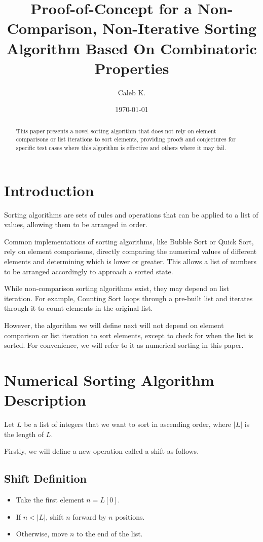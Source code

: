 \documentclass[12pt]{article}
\title{Proof-of-Concept for a Non-Comparison, Non-Iterative Sorting Algorithm Based On Combinatoric Properties}
\author{Caleb K.}
\date{\today}
\begin{document}
\maketitle

\begin{abstract}
This paper presents a novel sorting algorithm that does not rely on element comparisons or list iterations to sort elements, providing proofs and conjectures for specific test cases where this algorithm is effective and others where it may fail.
\end{abstract}

\section{Introduction}

Sorting algorithms are sets of rules and operations that can be applied to a list of values, allowing them to be arranged in order.

Common implementations of sorting algorithms, like Bubble Sort or Quick Sort, rely on element comparisons, directly comparing the numerical values of different elements and determining which is lower or greater. This allows a list of numbers to be arranged accordingly to approach a sorted state.

While non-comparison sorting algorithms exist, they may depend on list iteration. For example, Counting Sort loops through a pre-built list and iterates through it to count elements in the original list.

However, the algorithm we will define next will not depend on element comparison or list iteration to sort elements, except to check for when the list is sorted. For convenience, we will refer to it as numerical sorting in this paper.

\section{Numerical Sorting Algorithm Description}
Let $L$ be a list of integers that we want to sort in ascending order, where $|L|$ is the length of $L$.

Firstly, we will define a new operation called a shift as follows.

\subsection*{Shift Definition}

\begin{itemize}
    \item Take the first element $n = L[0]$.
    \item If $n < |L|$, shift $n$ forward by $n$ positions.
    \item Otherwise, move $n$ to the end of the list.
\end{itemize}
\end{document}
